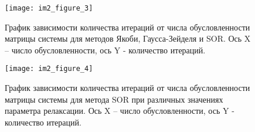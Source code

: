 \begin{figure}[ht]
\texttt{[image: im2\_figure\_3]}
\caption{График зависимости количества итераций от числа обусловленности матрицы системы для методов Якоби, Гаусса-Зейделя и SOR. Ось X – число обусловленности, ось Y - количество итераций. }

\end{figure}


\begin{figure}[ht]
\texttt{[image: im2\_figure\_4]}
\caption{График зависимости количества итераций от числа обусловленности матрицы системы для метода SOR при различных значениях параметра релаксации. Ось X – число обусловленности, ось Y - количество итераций. }
\end{figure}




